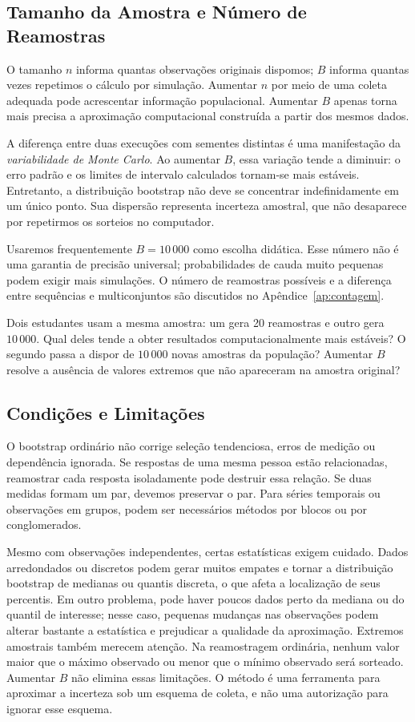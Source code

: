 \documentclass[12pt,a4paper]{article}
\begin{document}
\subsection{Tamanho da Amostra e Número de Reamostras}
O tamanho $n$ informa quantas observações originais dispomos; $B$ informa quantas vezes repetimos o cálculo por simulação. Aumentar $n$ por meio de uma coleta adequada pode acrescentar informação populacional. Aumentar $B$ apenas torna mais precisa a aproximação computacional construída a partir dos mesmos dados.

A diferença entre duas execuções com sementes distintas é uma manifestação da \emph{variabilidade de Monte Carlo}. Ao aumentar $B$, essa variação tende a diminuir: o erro padrão e os limites de intervalo calculados tornam-se mais estáveis. Entretanto, a distribuição bootstrap não deve se concentrar indefinidamente em um único ponto. Sua dispersão representa incerteza amostral, que não desaparece por repetirmos os sorteios no computador.

Usaremos frequentemente $B=10\,000$ como escolha didática. Esse número não é uma garantia de precisão universal; probabilidades de cauda muito pequenas podem exigir mais simulações. O número de reamostras possíveis e a diferença entre sequências e multiconjuntos são discutidos no Apêndice~\ref{ap:contagem}.

\begin{perguntabox}
Dois estudantes usam a mesma amostra: um gera 20 reamostras e outro gera $10\,000$. Qual deles tende a obter resultados computacionalmente mais estáveis? O segundo passa a dispor de $10\,000$ novas amostras da população? Aumentar $B$ resolve a ausência de valores extremos que não apareceram na amostra original?
\end{perguntabox}

\subsection{Condições e Limitações}
O bootstrap ordinário não corrige seleção tendenciosa, erros de medição ou dependência ignorada. Se respostas de uma mesma pessoa estão relacionadas, reamostrar cada resposta isoladamente pode destruir essa relação. Se duas medidas formam um par, devemos preservar o par. Para séries temporais ou observações em grupos, podem ser necessários métodos por blocos ou por conglomerados.

Mesmo com observações independentes, certas estatísticas exigem cuidado. Dados arredondados ou discretos podem gerar muitos empates e tornar a distribuição bootstrap de medianas ou quantis discreta, o que afeta a localização de seus percentis. Em outro problema, pode haver poucos dados perto da mediana ou do quantil de interesse; nesse caso, pequenas mudanças nas observações podem alterar bastante a estatística e prejudicar a qualidade da aproximação. Extremos amostrais também merecem atenção. Na reamostragem ordinária, nenhum valor maior que o máximo observado ou menor que o mínimo observado será sorteado. Aumentar $B$ não elimina essas limitações. O método é uma ferramenta para aproximar a incerteza sob um esquema de coleta, e não uma autorização para ignorar esse esquema.
\end{document}
